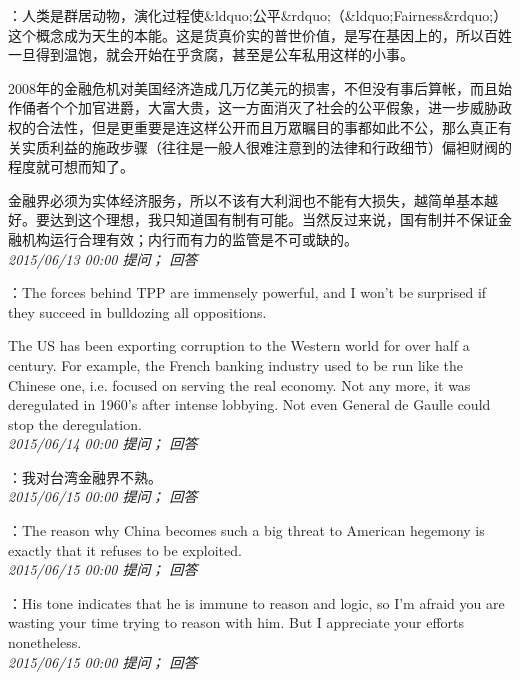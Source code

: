 \documentclass[twocolumn]{ctexart}
\begin{document}
：人类是群居动物，演化过程使\&ldquo;公平\&rdquo;（\&ldquo;Fairness\&rdquo;）这个概念成为天生的本能。这是货真价实的普世价值，是写在基因上的，所以百姓一旦得到温饱，就会开始在乎贪腐，甚至是公车私用这样的小事。

2008年的金融危机对美国经济造成几万亿美元的损害，不但没有事后算帐，而且始作俑者个个加官进爵，大富大贵，这一方面消灭了社会的公平假象，进一步威胁政权的合法性，但是更重要是连这样公开而且万眾瞩目的事都如此不公，那么真正有关实质利益的施政步骤（往往是一般人很难注意到的法律和行政细节）偏袒财阀的程度就可想而知了。

金融界必须为实体经济服务，所以不该有大利润也不能有大损失，越简单基本越好。要达到这个理想，我只知道国有制有可能。当然反过来说，国有制并不保证金融机构运行合理有效；内行而有力的监管是不可或缺的。\\

\textit{\hfill\noindent\small 2015/06/13 00:00 提问； 回答}

：The forces behind TPP are immensely powerful, and I won't be surprised if they succeed in bulldozing all oppositions.

The US has been exporting corruption to the Western world for over half a century. For example, the French banking industry used to be run like the Chinese one, i.e. focused on serving the real economy. Not any more, it was deregulated in 1960's after intense lobbying. Not even General de Gaulle could stop the deregulation.\\

\textit{\hfill\noindent\small 2015/06/14 00:00 提问； 回答}

：我对台湾金融界不熟。\\

\textit{\hfill\noindent\small 2015/06/15 00:00 提问； 回答}

：The reason why China becomes such a big threat to American hegemony is exactly that it refuses to be exploited.\\

\textit{\hfill\noindent\small 2015/06/15 00:00 提问； 回答}

：His tone indicates that he is immune to reason and logic, so I'm afraid you are wasting your time trying to reason with him. But I appreciate your efforts nonetheless.\\

\textit{\hfill\noindent\small 2015/06/15 00:00 提问； 回答}
\end{document}
